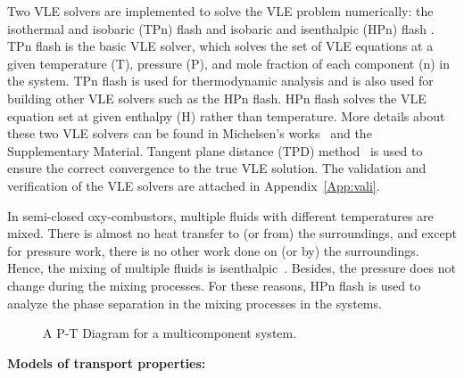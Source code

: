 Two VLE solvers are implemented to solve the VLE problem numerically: the isothermal and isobaric (TPn) flash \citep{michelsen1982isothermal} and isobaric and isenthalpic (HPn) flash \citep{michelsen1987multiphase}.
TPn flash is the basic VLE solver, which solves the set of VLE equations at a given temperature (T), pressure (P), and mole fraction of each component (n) in the system. TPn flash is used for thermodynamic analysis and is also used for building other VLE solvers such as the HPn flash. HPn flash solves the VLE equation set at given enthalpy (H) rather than temperature. More details about these two VLE solvers can be found in Michelsen's works~\cite{michelsen1982isothermal,michelsen1987multiphase} and the Supplementary Material. Tangent plane distance (TPD) method~\cite{michelsen1982isothermalP1} is used to ensure the correct convergence to the true VLE solution.  %
The validation and verification of the VLE solvers are attached in Appendix~\ref{App:vali}.

In semi-closed  oxy-combustors, multiple fluids with different temperatures are mixed. There is almost no heat transfer to (or from) the surroundings, and except for pressure work, there is no other work done on (or by) the surroundings. Hence, the mixing of multiple fluids is isenthalpic~\cite{serrano2018development}.
Besides, the pressure does not change during the mixing processes. For these reasons, HPn flash is used to analyze the phase separation in the mixing processes in the  systems. %


    \begin{figure}[htb]
        \centering
        \caption{A P-T Diagram for a multicomponent system.}\label{TPdiagram}

    \end{figure}

\noindent\textbf{Models of transport properties:}

